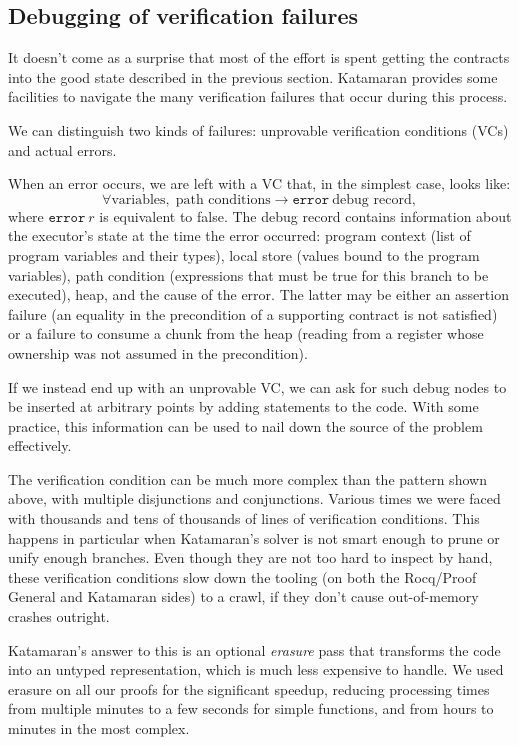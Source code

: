 \subsection{Debugging of verification failures}

It doesn't come as a surprise that most of the effort is spent getting the contracts into the good state described in the previous section. Katamaran provides some facilities to navigate the many verification failures that occur during this process.

We can distinguish two kinds of failures: unprovable verification conditions (VCs) and actual errors.

When an error occurs, we are left with a VC that, in the simplest case, looks like:
\[ \forall \text{variables},\; \text{path conditions} \to \texttt{error}~\text{debug record}, \]
where \(\texttt{error}~r\) is equivalent to false. The debug record contains information about the executor's state at the time the error occurred: program context (list of program variables and their types), local store (values bound to the program variables), path condition (expressions that must be true for this branch to be executed), heap, and the cause of the error. The latter may be either an assertion failure (\eg an equality in the precondition of a supporting contract is not satisfied) or a failure to consume a chunk from the heap (\eg reading from a register whose ownership was not assumed in the precondition).

If we instead end up with an unprovable VC, we can ask for such debug nodes to be inserted at arbitrary points by adding  statements to the \usail code. With some practice, this information can be used to nail down the source of the problem effectively.

The verification condition can be much more complex than the pattern shown above, with multiple disjunctions and conjunctions. Various times we were faced with thousands and tens of thousands of lines of verification conditions. This happens in particular when Katamaran's solver is not smart enough to prune or unify enough branches. Even though they are not too hard to inspect by hand, these verification conditions slow down the tooling (on both the Rocq/Proof General and Katamaran sides) to a crawl, if they don't cause out-of-memory crashes outright.

Katamaran's answer to this is an optional \emph{erasure} pass that transforms the \usail code into an untyped representation, which is much less expensive to handle. We used erasure on all our proofs for the significant speedup, reducing processing times from multiple minutes to a few seconds for simple functions, and from hours to minutes in the most complex.

